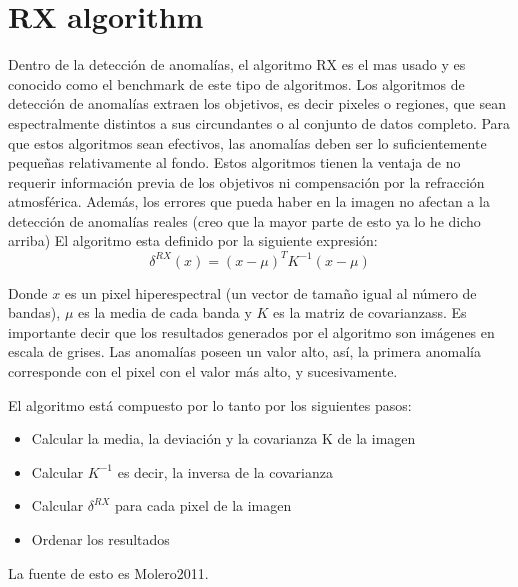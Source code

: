 \section{RX algorithm}
Dentro de la detección de anomalías, el algoritmo RX es el mas usado y es conocido como el benchmark de este tipo de algoritmos.
Los algoritmos de detección de anomalías extraen los objetivos, es decir pixeles o regiones, que sean espectralmente distintos a sus circundantes o al conjunto de datos completo. Para que estos algoritmos sean efectivos, las anomalías deben ser lo suficientemente pequeñas relativamente al fondo. Estos algoritmos tienen la ventaja de no requerir información previa de los objetivos ni compensación por la refracción atmosférica. Además, los errores que pueda haber en la imagen no afectan a la detección de anomalías reales (creo que la mayor parte de esto ya lo he dicho arriba)
\bigskip
El algoritmo esta definido por la siguiente expresión:
\\
\[\delta ^{RX}(x) = (x-\mu)^{T}K^{-1}(x-\mu)\]

Donde $x$ es un pixel hiperespectral (un vector de tamaño igual al número de bandas), $\mu$ es la media de cada banda y $K$ es la matriz de covarianzass. Es importante decir que los resultados generados por el algoritmo son imágenes en escala de grises. Las anomalías poseen un valor alto, así, la primera anomalía corresponde con el pixel con el valor más alto, y sucesivamente.

El algoritmo está compuesto por lo tanto por los siguientes pasos:
\begin{itemize}
\item Calcular la media, la deviación y la covarianza K de la imagen
\item Calcular $K^{-1}$ es decir, la inversa de la covarianza
\item Calcular $\delta ^{RX}$ para cada pixel de la imagen
\item Ordenar los resultados
\end{itemize}

La fuente de esto es Molero2011.
